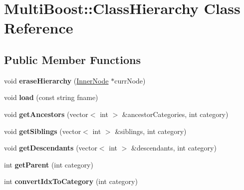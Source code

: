\hypertarget{classMultiBoost_1_1ClassHierarchy}{\section{Multi\-Boost\-:\-:Class\-Hierarchy Class Reference}
\label{classMultiBoost_1_1ClassHierarchy}
}
\subsection*{Public Member Functions}
\begin{DoxyCompactItemize}
\item 
\hypertarget{classMultiBoost_1_1ClassHierarchy_a713a304ff6a60a90f52c3b04f4845d24}{void {\bfseries erase\-Hierarchy} (\hyperlink{classMultiBoost_1_1InnerNode}{Inner\-Node} $\ast$curr\-Node)}\label{classMultiBoost_1_1ClassHierarchy_a713a304ff6a60a90f52c3b04f4845d24}

\item 
\hypertarget{classMultiBoost_1_1ClassHierarchy_a1b2dfcee5ab00e34ded086c4870be807}{void {\bfseries load} (const string fname)}\label{classMultiBoost_1_1ClassHierarchy_a1b2dfcee5ab00e34ded086c4870be807}

\item 
\hypertarget{classMultiBoost_1_1ClassHierarchy_aa680ed92cb5bcb7aea3bfcaccf5a8b8f}{void {\bfseries get\-Ancestors} (vector$<$ int $>$ \&ancestor\-Categories, int category)}\label{classMultiBoost_1_1ClassHierarchy_aa680ed92cb5bcb7aea3bfcaccf5a8b8f}

\item 
\hypertarget{classMultiBoost_1_1ClassHierarchy_a018426d9f4562bef5ce37c0cd8ec8735}{void {\bfseries get\-Siblings} (vector$<$ int $>$ \&siblings, int category)}\label{classMultiBoost_1_1ClassHierarchy_a018426d9f4562bef5ce37c0cd8ec8735}

\item 
\hypertarget{classMultiBoost_1_1ClassHierarchy_a54c07db6dac54207f0e9d380fff956b4}{void {\bfseries get\-Descendants} (vector$<$ int $>$ \&descendants, int category)}\label{classMultiBoost_1_1ClassHierarchy_a54c07db6dac54207f0e9d380fff956b4}

\item 
\hypertarget{classMultiBoost_1_1ClassHierarchy_abe9b409318c3140f7bd815a4197b08e6}{int {\bfseries get\-Parent} (int category)}\label{classMultiBoost_1_1ClassHierarchy_abe9b409318c3140f7bd815a4197b08e6}

\item 
\hypertarget{classMultiBoost_1_1ClassHierarchy_a91cf9db3b8ee9954eaa9679569580acc}{int {\bfseries convert\-Idx\-To\-Category} (int category)}\label{classMultiBoost_1_1ClassHierarchy_a91cf9db3b8ee9954eaa9679569580acc}


\end{DoxyCompactItemize}

